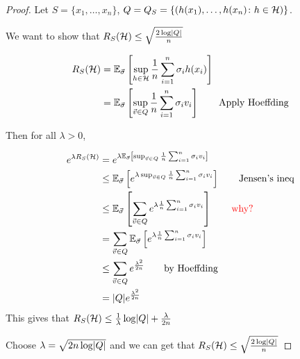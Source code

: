\begin{proof}
    Let \(S = \{x_1, \ldots, x_n\}\), \(Q = Q_S = \{\left(h(x_1), \ldots, h(x_n) \colon h \in \mathcal{H} \right)\}\). 

    We want to show that \(R_S(\mathcal{H}) \leq \sqrt{\frac{2\log \lvert Q \rvert}{n}}\) 

    \begin{align*}
        R_S (\mathcal{H}) &= \mathbb{E}_{\vec{\sigma}} \left[  \sup_{h\in \mathcal{H}} \frac{1}{n} \sum_{i=1}^n \sigma_i h(x_i)  \right] \\ 
                    &= \mathbb{E}_{\vec{\sigma}} \left[  \sup_{\vec{v} \in Q} \frac{1}{n} \sum_{i=1}^n \sigma_i v_i  \right] \tag*{Apply Hoeffding} 
    \end{align*}

    Then for all \(\lambda > 0\),  

    \begin{align*}
        e^{\lambda R_S(\Hcal)} &= e^{  \lambda \expec_{\vec{\sigma}} \midBrac{ \sup_{\vec{v} \in Q} \sampleAverage \sigma_i v_i }  } \\
                               &\leq \expec_{\vec{\sigma}} \midBrac{  e^{\lambda \sup_{\vec{v} \in Q} \sampleAverage \sigma_i v_i } } \tag*{Jensen's ineq} \\ 
                               & \leq \expec_{\vec{\sigma}} \midBrac{ \sum_{\vec{v} \in Q} e^{\lambda \sampleAverage \sigma_i v_i }} \tag*{\color{red}why?} \\ 
                               & = \sum_{\vec{v} \in Q} \expec_{\vec{\sigma}} \midBrac{ e^{\lambda \sampleAverage \sigma_i v_i} } \\ 
                               & \leq \sum_{\vec{v} \in Q} e^{\frac{\lambda^2}{2n}} \tag*{by Hoeffding} \\ 
                               &= \absolute{Q} e^{\frac{\lambda^2}{2n}}
    \end{align*}
    This gives that \(R_S(\mathcal{H}) \leq \frac{1}{\lambda} \log \lvert Q \rvert + \frac{\lambda}{2n}\) 

    Choose \(\lambda = \sqrt{2n \log \lvert Q \rvert}\) and we can get that \(R_S(\mathcal{H}) \leq \sqrt{\frac{2\log \lvert Q \rvert}{n}}\)
\end{proof}

